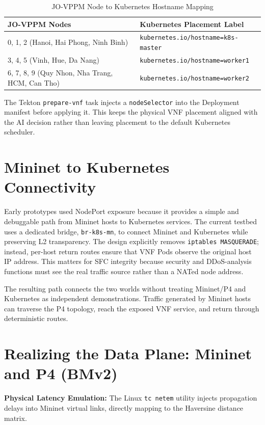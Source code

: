 \documentclass[12pt, a4paper, reqno, oneside]{book}
\begin{document}
\begin{table}[H]
\centering
\caption{JO-VPPM Node to Kubernetes Hostname Mapping}
\label{table:ai_k8s_mapping}
\begin{tabular}{ll}
\toprule
\textbf{JO-VPPM Nodes} & \textbf{Kubernetes Placement Label} \\
\midrule
0, 1, 2 (Hanoi, Hai Phong, Ninh Binh) & \texttt{kubernetes.io/hostname=k8s-master} \\
3, 4, 5 (Vinh, Hue, Da Nang) & \texttt{kubernetes.io/hostname=worker1} \\
6, 7, 8, 9 (Quy Nhon, Nha Trang, HCM, Can Tho) & \texttt{kubernetes.io/hostname=worker2} \\
\bottomrule
\end{tabular}
\end{table}

The Tekton \texttt{prepare-vnf} task injects a \texttt{nodeSelector} into the Deployment manifest before applying it. This keeps the physical VNF placement aligned with the AI decision rather than leaving placement to the default Kubernetes scheduler.

\section{Mininet to Kubernetes Connectivity}
Early prototypes used NodePort exposure because it provides a simple and debuggable path from Mininet hosts to Kubernetes services. The current testbed uses a dedicated bridge, \texttt{br-k8s-mn}, to connect Mininet and Kubernetes while preserving L2 transparency. The design explicitly removes \texttt{iptables MASQUERADE}; instead, per-host return routes ensure that VNF Pods observe the original host IP address. This matters for SFC integrity because security and DDoS-analysis functions must see the real traffic source rather than a NATed node address.

The resulting path connects the two worlds without treating Mininet/P4 and Kubernetes as independent demonstrations. Traffic generated by Mininet hosts can traverse the P4 topology, reach the exposed VNF service, and return through deterministic routes.

\section{Realizing the Data Plane: Mininet and P4 (BMv2)}

\textbf{Physical Latency Emulation:} The Linux \texttt{tc netem} utility injects propagation delays into Mininet virtual links, directly mapping to the Haversine distance matrix.
\end{document}
